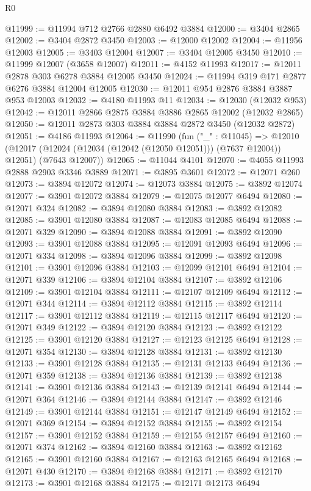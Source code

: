 \begin{lexlean}{R0}
\begin{coremodule}
@11999 := @11994 @712 @2766 @2880 @6492 @3884
@12000 := @3404 @2865
@12002 := @3404 @2872 @3450
@12003 := @12000 @12002
@12004 := @11956 @12003
@12005 := @3403 @12004
@12007 := @3404 @12005 @3450
@12010 := @11999 @12007 (@3658 @12007)
@12011 := @4152 @11993
@12017 := @12011 @2878 @303 @6278 @3884 @12005 @3450
@12024 := @11994 @319 @171 @2877 @6276 @3884 @12004 @12005
@12030 := @12011 @954 @2876 @3884 @3887 @953 @12003
@12032 := @4180 @11993 @11
@12034 := @12030 (@12032 @953)
@12042 := @12011 @2866 @2875 @3884 @3886 @2865 @12002 (@12032 @2865)
@12050 := @12011 @2873 @303 @3884 @3884 @2872 @3450 (@12032 @2872)
@12051 := @4186 @11993
@12064 := @11990
    (fun ("_" : @11045) =>
    @12010 (@12017 (@12024 (@12034 (@12042 (@12050 @12051))) (@7637 @12004)) @12051) (@7643 @12007))
@12065 := @11044 @4101
@12070 := @4055 @11993 @2888 @2903 @3346 @3889
@12071 := @3895 @3601
@12072 := @12071 @260
@12073 := @3894 @12072
@12074 := @12073 @3884
@12075 := @3892 @12074
@12077 := @3901 @12072 @3884
@12079 := @12075 @12077 @6494
@12080 := @12071 @324
@12082 := @3894 @12080 @3884
@12083 := @3892 @12082
@12085 := @3901 @12080 @3884
@12087 := @12083 @12085 @6494
@12088 := @12071 @329
@12090 := @3894 @12088 @3884
@12091 := @3892 @12090
@12093 := @3901 @12088 @3884
@12095 := @12091 @12093 @6494
@12096 := @12071 @334
@12098 := @3894 @12096 @3884
@12099 := @3892 @12098
@12101 := @3901 @12096 @3884
@12103 := @12099 @12101 @6494
@12104 := @12071 @339
@12106 := @3894 @12104 @3884
@12107 := @3892 @12106
@12109 := @3901 @12104 @3884
@12111 := @12107 @12109 @6494
@12112 := @12071 @344
@12114 := @3894 @12112 @3884
@12115 := @3892 @12114
@12117 := @3901 @12112 @3884
@12119 := @12115 @12117 @6494
@12120 := @12071 @349
@12122 := @3894 @12120 @3884
@12123 := @3892 @12122
@12125 := @3901 @12120 @3884
@12127 := @12123 @12125 @6494
@12128 := @12071 @354
@12130 := @3894 @12128 @3884
@12131 := @3892 @12130
@12133 := @3901 @12128 @3884
@12135 := @12131 @12133 @6494
@12136 := @12071 @359
@12138 := @3894 @12136 @3884
@12139 := @3892 @12138
@12141 := @3901 @12136 @3884
@12143 := @12139 @12141 @6494
@12144 := @12071 @364
@12146 := @3894 @12144 @3884
@12147 := @3892 @12146
@12149 := @3901 @12144 @3884
@12151 := @12147 @12149 @6494
@12152 := @12071 @369
@12154 := @3894 @12152 @3884
@12155 := @3892 @12154
@12157 := @3901 @12152 @3884
@12159 := @12155 @12157 @6494
@12160 := @12071 @374
@12162 := @3894 @12160 @3884
@12163 := @3892 @12162
@12165 := @3901 @12160 @3884
@12167 := @12163 @12165 @6494
@12168 := @12071 @430
@12170 := @3894 @12168 @3884
@12171 := @3892 @12170
@12173 := @3901 @12168 @3884
@12175 := @12171 @12173 @6494

\end{coremodule}
\end{lexlean}
